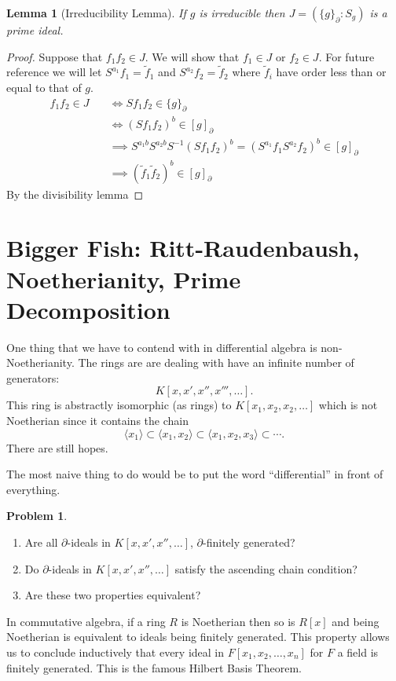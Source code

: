 \documentclass[12pt]{book}
\numberwithin{equation}{section}
\newtheorem{lemma}[theorem]{Lemma}
\theoremstyle{definition}
\newtheorem{problem}[theorem]{Problem}
\theoremstyle{remark}
\begin{document}
\begin{lemma}[Irreducibility Lemma]
If $g$ is irreducible then $J = ( \lbrace g \rbrace_{\partial} : S_g)$ is a prime ideal. 
\end{lemma}
\begin{proof}
	Suppose that $f_1f_2 \in J$.
	We will show that $f_1 \in J$ or $f_2 \in J$.
	For future reference we will let $S^{a_1}f_1 = \widetilde{f}_1$ and $S^{a_2}f_2 = \widetilde{f}_2$ where $\widetilde{f}_i$ have order less than or equal to that of $g$.
	\begin{align*} 
	f_1f_2 \in J \quad &\iff  S f_1f_2 \in \lbrace g \rbrace_{\partial} \\
	&\iff (Sf_1f_2)^b \in [g]_{\partial}\\
	&\implies S^{a_1b}S^{a_2b}S^{-1} (S f_1f_2)^b  = (S^{a_1}f_1 S^{a_2} f_2)^b \in [g]_{\partial} \\
	&\implies (\widetilde{f}_1\widetilde{f}_2)^b \in [g]_{\partial} 
	\end{align*}
	By the divisibility lemma
\end{proof}


\section{Bigger Fish: Ritt-Raudenbaush, Noetherianity, Prime Decomposition}

One thing that we have to contend with in differential algebra is non-Noetherianity. 
The rings are are dealing with have an infinite number of generators:
$$ K[x,x',x'',x''',\ldots].$$
This ring is abstractly isomorphic (as rings) to $K[x_1,x_2,x_2,\ldots]$ which is not Noetherian since it contains the chain 
$$\langle x_1 \rangle \subset \langle x_1,x_2\rangle \subset \langle x_1,x_2,x_3\rangle \subset \cdots.$$
There are still hopes.

The most naive thing to do would be to put the word ``differential'' in front of everything. 
\begin{problem}
	\begin{enumerate}
		\item Are all $\partial$-ideals in $K[x,x',x'',\ldots]$, $\partial$-finitely generated?
		\item Do $\partial$-ideals in $K[x,x',x'',\ldots]$ satisfy the ascending chain condition?
		\item Are these two properties equivalent?
	\end{enumerate}
\end{problem}
In commutative algebra, if a ring $R$ is Noetherian then so is $R[x]$ and being Noetherian is equivalent to ideals being finitely generated. 
This property allows us to conclude inductively that every ideal in $F[x_1,x_2,\ldots,x_n]$ for $F$ a field is finitely generated. 
This is the famous Hilbert Basis Theorem.
\end{document}

